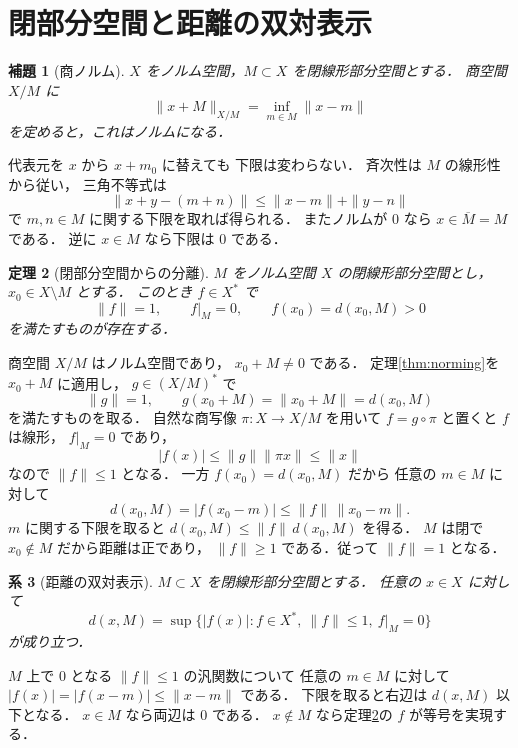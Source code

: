 \documentclass[a5paper,10pt,onecolumn]{jsarticle}
\makeatletter
\theoremstyle{mathnotetheorem}
\newtheorem{theorem}{定理}[section]
\newtheorem{lemma}[theorem]{補題}
\newtheorem{corollary}[theorem]{系}
\renewcommand{\proofname}{証明}
\renewenvironment{proof}[1][\proofname]{%
  \par\pushQED{\qed}\normalfont\topsep4\p@\@plus2\p@\relax
  \trivlist\item[\hskip\labelsep\bfseries #1]\ignorespaces
}{\popQED\endtrivlist\@endpefalse}
\makeatother
\begin{document}
\section{閉部分空間と距離の双対表示}

\begin{lemma}[商ノルム]
$X$ をノルム空間，$M\subset X$ を閉線形部分空間とする．
商空間 $X/M$ に
\[
 \|x+M\|_{X/M}=\inf_{m\in M}\|x-m\|
\]
を定めると，これはノルムになる．
\end{lemma}
\begin{proof}
代表元を $x$ から $x+m_0$ に替えても
下限は変わらない．
斉次性は $M$ の線形性から従い，
三角不等式は
\[
 \|x+y-(m+n)\|\le\|x-m\|+\|y-n\|
\]
で $m,n\in M$ に関する下限を取れば得られる．
またノルムが $0$ なら $x\in\overline M=M$ である．
逆に $x\in M$ なら下限は $0$ である．
\end{proof}

\begin{theorem}[閉部分空間からの分離]\label{thm:subspace-separate}
$M$ をノルム空間 $X$ の閉線形部分空間とし，
$x_0\in X\setminus M$ とする．
このとき $f\in X^*$ で
\[
 \|f\|=1,\qquad f|_M=0,\qquad
 f(x_0)=d(x_0,M)>0
\]
を満たすものが存在する．
\end{theorem}
\begin{proof}
商空間 $X/M$ はノルム空間であり，
$x_0+M\ne0$ である．
定理\ref{thm:norming}を $x_0+M$ に適用し，
$g\in(X/M)^*$ で
\[
 \|g\|=1,\qquad
 g(x_0+M)=\|x_0+M\|=d(x_0,M)
\]
を満たすものを取る．
自然な商写像 $\pi:X\to X/M$ を用いて
$f=g\circ\pi$ と置くと $f$ は線形，
$f|_M=0$ であり，
\[
 |f(x)|\le\|g\|\|\pi x\|
 \le\|x\|
\]
なので $\|f\|\le1$ となる．
一方 $f(x_0)=d(x_0,M)$ だから
任意の $m\in M$ に対して
\[
 d(x_0,M)=|f(x_0-m)|
 \le\|f\|\,\|x_0-m\|.
\]
$m$ に関する下限を取ると
$d(x_0,M)\le\|f\|\,d(x_0,M)$ を得る．
$M$ は閉で $x_0\notin M$ だから距離は正であり，
$\|f\|\ge1$ である．従って $\|f\|=1$ となる．
\end{proof}

\begin{corollary}[距離の双対表示]\label{cor:distance}
$M\subset X$ を閉線形部分空間とする．
任意の $x\in X$ に対して
\[
 d(x,M)=
 \sup\{|f(x)|:f\in X^*,\
           \|f\|\le1,\ f|_M=0\}
\]
が成り立つ．
\end{corollary}
\begin{proof}
$M$ 上で $0$ となる $\|f\|\le1$ の汎関数について
任意の $m\in M$ に対して
$|f(x)|=|f(x-m)|\le\|x-m\|$ である．
下限を取ると右辺は $d(x,M)$ 以下となる．
$x\in M$ なら両辺は $0$ である．
$x\notin M$ なら定理\ref{thm:subspace-separate}の
$f$ が等号を実現する．
\end{proof}
\end{document}
